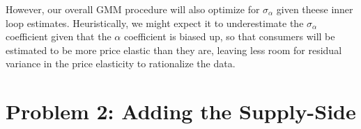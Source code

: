 \documentclass{article}
\begin{document}
\begin{enumerate}
\begin{answer}
However, our overall GMM procedure will also optimize for $\sigma_\alpha$ given theese inner loop estimates. Heuristically, we might expect it to underestimate the $\sigma_{\alpha}$ coefficient given that the $\alpha$ coefficient is biased up, so that consumers will be estimated to be more price elastic than they are, leaving less room for residual variance in the price elasticity to rationalize the data. 




\end{answer}


\end{enumerate}

\section*{Problem 2: Adding the Supply-Side}
\end{document}
